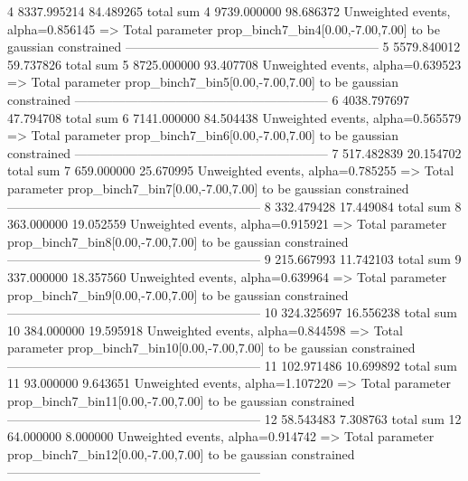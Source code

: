 4          8337.995214     84.489265       total sum                     
4          9739.000000     98.686372       Unweighted events, alpha=0.856145
  => Total parameter prop_binch7_bin4[0.00,-7.00,7.00] to be gaussian constrained
------------------------------------------------------------
5          5579.840012     59.737826       total sum                     
5          8725.000000     93.407708       Unweighted events, alpha=0.639523
  => Total parameter prop_binch7_bin5[0.00,-7.00,7.00] to be gaussian constrained
------------------------------------------------------------
6          4038.797697     47.794708       total sum                     
6          7141.000000     84.504438       Unweighted events, alpha=0.565579
  => Total parameter prop_binch7_bin6[0.00,-7.00,7.00] to be gaussian constrained
------------------------------------------------------------
7          517.482839      20.154702       total sum                     
7          659.000000      25.670995       Unweighted events, alpha=0.785255
  => Total parameter prop_binch7_bin7[0.00,-7.00,7.00] to be gaussian constrained
------------------------------------------------------------
8          332.479428      17.449084       total sum                     
8          363.000000      19.052559       Unweighted events, alpha=0.915921
  => Total parameter prop_binch7_bin8[0.00,-7.00,7.00] to be gaussian constrained
------------------------------------------------------------
9          215.667993      11.742103       total sum                     
9          337.000000      18.357560       Unweighted events, alpha=0.639964
  => Total parameter prop_binch7_bin9[0.00,-7.00,7.00] to be gaussian constrained
------------------------------------------------------------
10         324.325697      16.556238       total sum                     
10         384.000000      19.595918       Unweighted events, alpha=0.844598
  => Total parameter prop_binch7_bin10[0.00,-7.00,7.00] to be gaussian constrained
------------------------------------------------------------
11         102.971486      10.699892       total sum                     
11         93.000000       9.643651        Unweighted events, alpha=1.107220
  => Total parameter prop_binch7_bin11[0.00,-7.00,7.00] to be gaussian constrained
------------------------------------------------------------
12         58.543483       7.308763        total sum                     
12         64.000000       8.000000        Unweighted events, alpha=0.914742
  => Total parameter prop_binch7_bin12[0.00,-7.00,7.00] to be gaussian constrained
------------------------------------------------------------
